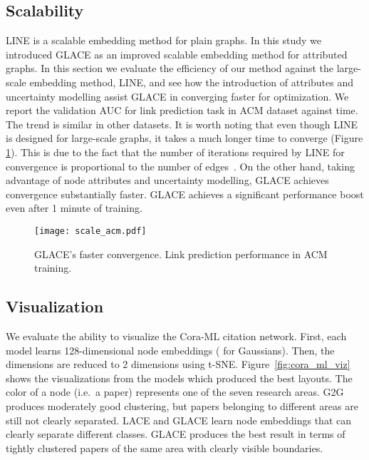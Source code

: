 \documentclass[runningheads]{llncs}
\begin{document}
\subsection{Scalability}

LINE is a scalable embedding method for plain graphs. In this study we introduced GLACE as an improved scalable embedding method for attributed graphs. In this section we evaluate the efficiency of our method against the large-scale embedding method, LINE, and see how the introduction of attributes and uncertainty modelling assist GLACE in converging faster for optimization. We report the validation AUC for link prediction task in ACM dataset against time. The trend is similar in other datasets.
It is worth noting that even though LINE is designed for large-scale graphs, it takes a much longer time to converge (Figure \ref{fig:scale}). This is due to the fact that the number of iterations required by LINE for convergence is proportional to the number of edges~\cite{DBLP:line}. On the other hand, taking advantage of node attributes and uncertainty modelling, GLACE achieves convergence substantially faster. GLACE achieves a significant performance boost even after 1 minute of training.

\begin{figure}[t]
    \centering
    \texttt{[image: scale\_acm.pdf]}
    \caption{\small GLACE's faster convergence. Link prediction performance in ACM training.}
    \label{fig:scale}
    \vspace{-4mm}
\end{figure}

\subsection{Visualization}

We evaluate the ability to visualize the Cora-ML citation network. 
First, each model learns 128-dimensional node embeddings ( for Gaussians). 
Then, the dimensions are reduced to 2 dimensions using t-SNE. 
Figure~\ref{fig:cora_ml_viz} shows the visualizations from the models which produced the best layouts. 
The color of a node (i.e.\ a paper) represents one of the seven research areas.
G2G produces moderately good clustering, but papers belonging to different areas are still not clearly separated. 
LACE and GLACE learn node embeddings that can clearly separate different classes. 
GLACE produces the best result in terms of tightly clustered papers of the same area with clearly visible boundaries.
\end{document}
